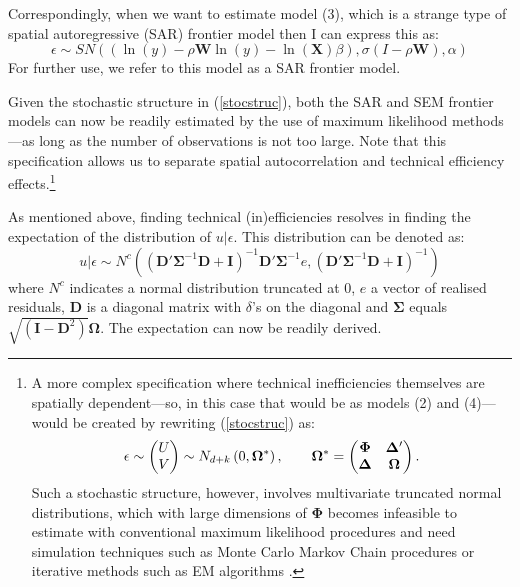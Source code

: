 \documentclass[11pt,parskip,abstracton,notitlepage]{scrartcl}
\begin{document}
Correspondingly, when we want to estimate model (3), which is a strange type of spatial autoregressive (SAR) frontier model then I can express this as: 
$$\epsilon  \sim SN( \left(\ln \left(y\right)  -\rho \mathbf{W} \ln(y) - \ln \left(\mathbf{X}\right) \beta \right), \sigma \left(I - \rho \mathbf{W}\right), \alpha)$$ 
For further use, we refer to this model as a SAR frontier model.

Given the stochastic structure in (\ref{stocstruc}), both the SAR and SEM frontier models can now be readily estimated by the use of maximum likelihood methods---as long as the number of observations is not too large. Note that this specification allows us to separate spatial autocorrelation and technical efficiency effects.\footnote{A more complex specification where technical inefficiencies themselves are spatially dependent---so, in this case that would be as models (2) and (4)---would be created by rewriting (\ref{stocstruc}) as:
\begin{equation}
\epsilon   \sim \begin{pmatrix} U \\ V \end{pmatrix} \sim N_{d+k}\left(0,\mathbf{\Omega}^\ast\right), \qquad \mathbf{\Omega}^\ast=\begin{pmatrix} \mathbf{\Phi} & \mathbf{\Delta}' \\ \mathbf{\Delta} & \mathbf{\Omega} \end{pmatrix}.\notag
\label{eq:fullomega}
\end{equation}
Such a stochastic structure, however, involves multivariate truncated normal distributions, which with large dimensions of $\mathbf{\Phi}$ becomes infeasible to estimate with conventional maximum likelihood procedures and need simulation techniques such as Monte Carlo Markov Chain procedures \citep[see as well][]{dominguez2007matrix} or iterative methods such as EM algorithms \citep[see for a nice exposition][]{lin2009maximum}.}

As mentioned above, finding technical (in)efficiencies resolves in finding the expectation of the distribution of $u|\epsilon$. This distribution can be denoted as:
\begin{equation}
u|\epsilon \sim N^c\left(\left(\mathbf{D}'\mathbf{\Sigma}^{-1}\mathbf{D}+\mathbf{I}\right)^{-1}\mathbf{D}'\mathbf{\Sigma}^{-1}e,
 \left(\mathbf{D}'\mathbf{\Sigma}^{-1}\mathbf{D}+\mathbf{I}\right)^{-1} \right)
\label{eq:TE}
\end{equation}
where $N^c$ indicates a normal distribution truncated at $0$, $e$ a vector of realised residuals, $\mathbf{D}$ is a diagonal matrix with $\delta$'s on the diagonal and $\mathbf{\Sigma}$ equals $\sqrt{(\mathbf{I} - \mathbf{D}^2)}\mathbf{\Omega}$. The expectation can now be readily derived. 
\end{document}
